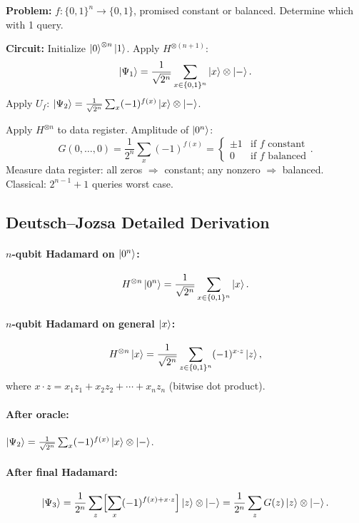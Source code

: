 \documentclass[10pt,a4paper]{article}
\begin{document}
\begin{tcolorbox}[algostyle, title={Algorithm}]
\textbf{Problem:} $f:\{0,1\}^n\to\{0,1\}$, promised constant or balanced. Determine which with 1 query.

\textbf{Circuit:} Initialize $\ket{0}^{\otimes n}\ket{1}$. Apply $H^{\otimes(n+1)}$:
\[
\ket{\Psi_1}=\frac{1}{\sqrt{2^n}}\sum_{x\in\{0,1\}^n}\ket{x}\otimes\ket{-}.
\]
Apply $U_f$: $\ket{\Psi_2}=\frac{1}{\sqrt{2^n}}\sum_x(-1)^{f(x)}\ket{x}\otimes\ket{-}$.

Apply $H^{\otimes n}$ to data register. Amplitude of $\ket{0^n}$:
\[
G(0,\dots,0)=\frac{1}{2^n}\sum_{x}(-1)^{f(x)} = \begin{cases}\pm 1 & \text{if }f\text{ constant}\\ 0 & \text{if }f\text{ balanced}\end{cases}.
\]
Measure data register: all zeros $\Rightarrow$ constant; any nonzero $\Rightarrow$ balanced. Classical: $2^{n-1}+1$ queries worst case.
\end{tcolorbox}

\subsection{Deutsch--Jozsa Detailed Derivation}

\paragraph{$n$-qubit Hadamard on $\ket{0^n}$:}
\[
H^{\otimes n}\ket{0^n} = \frac{1}{\sqrt{2^n}}\sum_{x\in\{0,1\}^n}\ket{x}.
\]

\paragraph{$n$-qubit Hadamard on general $\ket{x}$:}
\[
H^{\otimes n}\ket{x} = \frac{1}{\sqrt{2^n}}\sum_{z\in\{0,1\}^n}(-1)^{x\cdot z}\ket{z},
\]
where $x\cdot z=x_1z_1+x_2z_2+\cdots+x_nz_n$ (bitwise dot product).

\paragraph{After oracle:} $\ket{\Psi_2}=\frac{1}{\sqrt{2^n}}\sum_x(-1)^{f(x)}\ket{x}\otimes\ket{-}$.

\paragraph{After final Hadamard:}
\[
\ket{\Psi_3}=\frac{1}{2^n}\sum_z\Bigl[\sum_x(-1)^{f(x)+x\cdot z}\Bigr]\ket{z}\otimes\ket{-} = \frac{1}{2^n}\sum_z G(z)\ket{z}\otimes\ket{-}.
\]
\end{document}
